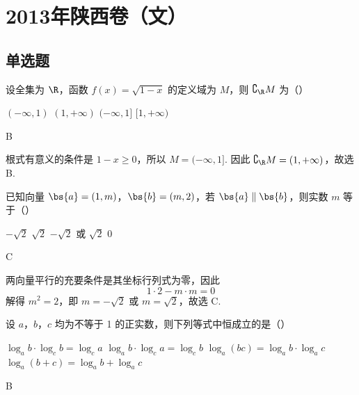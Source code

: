 \chapter{2013年陕西卷（文）}

\section{单选题}

\begin{problem}
设全集为 \(\R\)，函数 \(f(x) = \sqrt{1 - x}\) 的定义域为 \(M\)，则 \(\complement_{\R} M\) 为（\quad）

\choices
    {\((-\infty, 1)\)}
    {\((1, +\infty)\)}
    {\((-\infty, 1]\)}
    {\([1, +\infty)\)}
\end{problem}

\begin{answer}
B
\end{answer}

\begin{solution}
根式有意义的条件是 \(1-x\geqslant0\)，所以 \(M=(-\infty,1]\). 因此 \(\complement_{\R}M=(1,+\infty)\)，故选 B.
\end{solution}

\begin{problem}
已知向量 \(\bs{a} = (1, m)\)，\(\bs{b} = (m, 2)\)，若 \(\bs{a} \parallel \bs{b}\)，则实数 \(m\) 等于（\quad）

\choices
    {\(-\sqrt{2}\)}
    {\(\sqrt{2}\)}
    {\(-\sqrt{2}\) 或 \(\sqrt{2}\)}
    {0}
\end{problem}

\begin{answer}
C
\end{answer}

\begin{solution}
两向量平行的充要条件是其坐标行列式为零，因此
\[
1\cdot2-m\cdot m=0
\]
解得 \(m^2=2\)，即 \(m=-\sqrt{2}\) 或 \(m=\sqrt{2}\)，故选 C.
\end{solution}

\begin{problem}
设 \(a\)，\(b\)，\(c\) 均为不等于 1 的正实数，则下列等式中恒成立的是（\quad）

\choices
    {\(\log_a b \cdot \log_c b = \log_c a\)}
    {\(\log_a b \cdot \log_c a = \log_c b\)}
    {\(\log_a (bc) = \log_a b \cdot \log_a c\)}
    {\(\log_a(b + c) = \log_a b + \log_a c\)}
\end{problem}

\begin{answer}
B
\end{answer}

